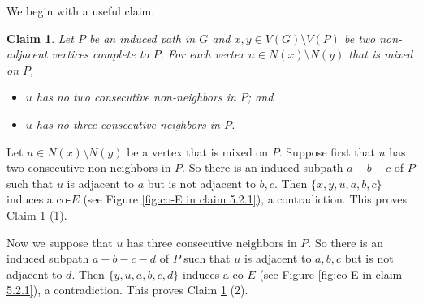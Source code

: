 \documentclass[a4paper,11pt]{article}
\newtheorem{claim}{Claim}[theorem]
\let\oldendproof\endproof
\renewenvironment{proof}[1][\proofname]{%
	\oldproof[\normalfont\bfseries #1]%
}{\oldendproof}
\renewcommand{\qedsymbol}{$\square$}%
\newenvironment{subproof}[1][\normalfont\it Subproof]{%
	\renewcommand{\qedsymbol}{{\tiny{$\blacksquare$}}}%
	\begin{proof}[#1]%
	}{%
	\end{proof}%
}
\begin{document}
    \begin{proof}
        We begin with a useful claim. 
        \begin{claim}\label{clm:a vertex mixed on a path via E}
            Let $P$ be an induced path in $G$ and $x,y\in V(G)\setminus V(P)$ be two non-adjacent vertices complete to $P$. 
            For each vertex $u\in N(x)\setminus N(y)$ that is mixed on $P$, 
            \begin{itemize}
                \item[$(1)$] $u$ has no two consecutive non-neighbors in $P$; and 
                \item[$(2)$] $u$ has no three consecutive neighbors in $P$.  
            \end{itemize} 
        \end{claim}
        \begin{subproof}[Proof of Claim \ref{clm:a vertex mixed on a path via E}]
            Let $u\in N(x)\setminus N(y)$ be a vertex that is mixed on $P$. 
            Suppose first that $u$ has two consecutive non-neighbors in $P$. 
            So there is an induced subpath $a-b-c$ of $P$ such that $u$ is adjacent to $a$ but is not adjacent to $b,c$. 
            Then $\{x,y,u,a,b,c\}$ induces a co-$E$ (see Figure \ref{fig:co-E in claim 5.2.1}), a contradiction. 
            This proves Claim \ref{clm:a vertex mixed on a path via E} (1). 

            Now we suppose that $u$ has three consecutive neighbors in $P$. 
            So there is an induced subpath $a-b-c-d$ of $P$ such that $u$ is adjacent to $a,b,c$ but is not adjacent to $d$. 
            Then $\{y,u,a,b,c,d\}$ induces a co-$E$ (see Figure \ref{fig:co-E in claim 5.2.1}), a contradiction. 
            This proves Claim \ref{clm:a vertex mixed on a path via E} (2). 
        \end{subproof}
        \begin{figure}[h!]
        \centering
\end{figure}
\end{proof}
\end{document}
